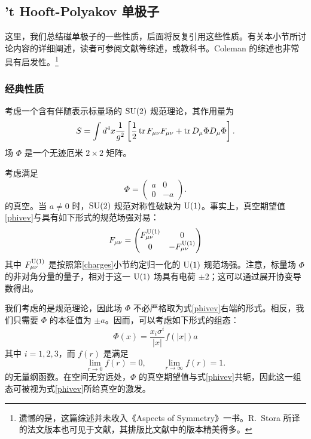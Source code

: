 \subsection{'t Hooft-Polyakov 单极子}\label{sec:monopole}
这里，我们总结磁单极子的一些性质，后面将反复引用这些性质。有关本小节所讨论内容的详细阐述，读者可参阅文献\cite{Harvey:1996ur,Weinberg:2006rq}等综述，或教科书\cite{Shifman}。Coleman 的综述\cite{Coleman:1982cx}也非常具有启发性。\footnote{遗憾的是，这篇综述并未收入《Aspects of Symmetry》一书。R.~Stora 所译的法文版本也可见于文献\cite{Coleman1982cxF}，其排版比文献\cite{Coleman:1982cx}中的版本精美得多。}
\subsubsection{经典性质}
考虑一个含有伴随表示标量场的 $\mathop{\mathrm{SU}}(2)$ 规范理论，其作用量为
\begin{equation}
S=\int d^4 x\frac{1}{g^2}\left[\frac{1}{2}\mathop{\mathrm{tr}}\nolimits F_{\mu\nu} F_{\mu\nu} + \mathop{\mathrm{tr}}\nolimits D_\mu\Phi D_\mu\Phi \right].
\end{equation}
场 $\Phi$ 是一个无迹厄米 $2\times 2$ 矩阵。

考虑满足
\begin{equation}
\Phi= \begin{pmatrix}a & 0 \\0 & -a\end{pmatrix}.\label{phivev}
\end{equation}
的真空。当 $a\neq 0$ 时，$\mathop{\mathrm{SU}}(2)$ 规范对称性破缺为 ${\mathrm{U}}(1)$。事实上，真空期望值\eqref{phivev}与具有如下形式的规范场强对易：
\begin{equation}
F_{\mu\nu}=\begin{pmatrix}
F_{\mu\nu}^{{\mathrm{U}}(1)} & 0\\
0 & -F_{\mu\nu}^{{\mathrm{U}}(1)}
\end{pmatrix}\label{u1embed}
\end{equation}
其中 $F_{\mu\nu}^{{\mathrm{U}}(1)}$ 是按照第\ref{charges}小节约定归一化的 ${\mathrm{U}}(1)$ 规范场强。注意，标量场 $\Phi$ 的非对角分量的量子，相对于这一 ${\mathrm{U}}(1)$ 场具有电荷 $\pm 2$；这可以通过展开协变导数得出。

我们考虑的是规范理论，因此场 $\Phi$ 不必严格取为式\eqref{phivev}右端的形式。相反，我们只需要 $\Phi$ 的本征值为 $\pm a$。因而，可以考虑如下形式的组态：
\begin{equation}
\Phi(x)=\frac{x_i \sigma^i}{|x|} f(|x|) a
\label{tHP}
\end{equation}
其中 $i=1,2,3$，而 $f(r)$ 是满足
\begin{equation}
\lim_{r\to 0} f(r)=0,\qquad
\lim_{r\to \infty} f(r)=1.
\end{equation}
的无量纲函数。在空间无穷远处，$\Phi$ 的真空期望值与式\eqref{phivev}共轭，因此这一组态可被视为式\eqref{phivev}所给真空的激发。

